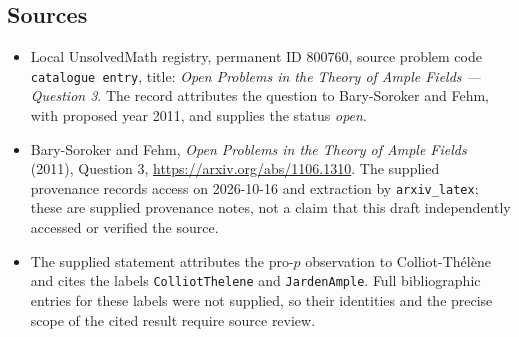 \documentclass[11pt]{article}
\begin{document}
\subsection{Sources}
\begin{itemize}
\item Local UnsolvedMath registry, permanent ID \(800760\), source problem code \texttt{catalogue entry}, title: \emph{Open Problems in the Theory of Ample Fields --- Question 3}. The record attributes the question to Bary-Soroker and Fehm, with proposed year 2011, and supplies the status \emph{open}.
\item Bary-Soroker and Fehm, \emph{Open Problems in the Theory of Ample Fields} (2011), Question 3, \url{https://arxiv.org/abs/1106.1310}. The supplied provenance records access on 2026-10-16 and extraction by \texttt{arxiv\_latex}; these are supplied provenance notes, not a claim that this draft independently accessed or verified the source.
\item The supplied statement attributes the pro-\(p\) observation to Colliot-Th\'el\`ene and cites the labels \texttt{ColliotThelene} and \texttt{JardenAmple}. Full bibliographic entries for these labels were not supplied, so their identities and the precise scope of the cited result require source review.
\end{itemize}
\end{document}
